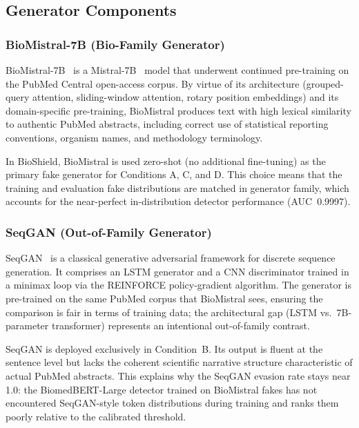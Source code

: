 \documentclass[12pt,a4paper]{article}
\begin{document}
\subsection{Generator Components}

\subsubsection{BioMistral-7B (Bio-Family Generator)}

BioMistral-7B~\cite{labrak2024biomistral} is a Mistral-7B~\cite{jiang2023mistral}
model that underwent continued pre-training on the PubMed Central open-access
corpus. By virtue of its architecture (grouped-query attention, sliding-window
attention, rotary position embeddings) and its domain-specific pre-training,
BioMistral produces text with high lexical similarity to authentic PubMed
abstracts, including correct use of statistical reporting conventions, organism
names, and methodology terminology.

In BioShield, BioMistral is used zero-shot (no additional fine-tuning) as the
primary fake generator for Conditions A, C, and D. This choice means that the
training and evaluation fake distributions are matched in generator family,
which accounts for the near-perfect in-distribution detector performance
(AUC~0.9997).

\subsubsection{SeqGAN (Out-of-Family Generator)}

SeqGAN~\cite{yu2017seqgan} is a classical generative adversarial framework
for discrete sequence generation. It comprises an LSTM generator and a CNN
discriminator trained in a minimax loop via the REINFORCE policy-gradient
algorithm. The generator is pre-trained on the same PubMed corpus that
BioMistral sees, ensuring the comparison is fair in terms of training data;
the architectural gap (LSTM vs.\ 7B-parameter transformer) represents an
intentional out-of-family contrast.

SeqGAN is deployed exclusively in Condition~B. Its output is fluent at the
sentence level but lacks the coherent scientific narrative structure
characteristic of actual PubMed abstracts. This explains why the SeqGAN
evasion rate stays near 1.0: the BiomedBERT-Large detector trained on
BioMistral fakes has not encountered SeqGAN-style token distributions during
training and ranks them poorly relative to the calibrated threshold.
\end{document}
